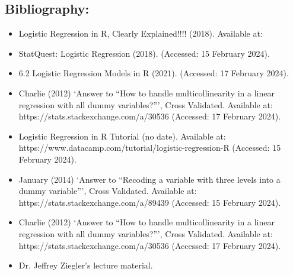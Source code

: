 \documentclass[12pt,letterpaper]{article}
\begin{document}
\begin{enumerate}
\begin{enumerate}
\subsection*{Bibliography:}
\begin{itemize}
\item Logistic Regression in R, Clearly Explained!!!! (2018). Available at: 
\item StatQuest: Logistic Regression (2018).  (Accessed: 15 February 2024).
\item 6.2 Logistic Regression Models in R (2021).  (Accessed: 17 February 2024).
\item Charlie (2012) ‘Answer to “How to handle multicollinearity in a linear regression with all dummy variables?”’, Cross Validated. Available at: https://stats.stackexchange.com/a/30536 (Accessed: 17 February 2024).
\item Logistic Regression in R Tutorial (no date). Available at: https://www.datacamp.com/tutorial/logistic-regression-R (Accessed: 15 February 2024).
\item January (2014) ‘Answer to “Recoding a variable with three levels into a dummy variable”’, Cross Validated. Available at: https://stats.stackexchange.com/a/89439 (Accessed: 15 February 2024).
\item Charlie (2012) ‘Answer to “How to handle multicollinearity in a linear regression with all dummy variables?”’, Cross Validated. Available at: https://stats.stackexchange.com/a/30536 (Accessed: 17 February 2024).
\item Dr. Jeffrey Ziegler's lecture material.
\end{itemize}
	\end{enumerate}
	\end{enumerate}
\end{document}
